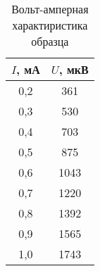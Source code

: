\begin{table}[h!]
    \begin{center}
        \begin{tabular}{|c|c|}
            \hline
            $I$, мА & $U$, мкВ \\ \hline
            0,2     & 361      \\ \hline
            0,3     & 530      \\ \hline
            0,4     & 703      \\ \hline
            0,5     & 875      \\ \hline
            0,6     & 1043     \\ \hline
            0,7     & 1220     \\ \hline
            0,8     & 1392     \\ \hline
            0,9     & 1565     \\ \hline
            1,0     & 1743     \\ \hline
        \end{tabular}
    \end{center}
    \caption{Вольт-амперная характиристика образца}
\end{table}